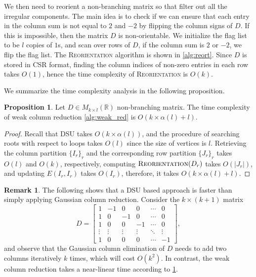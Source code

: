 \documentclass{article}
\theoremstyle{definition}
\newtheorem{remark}[theorem]{Remark}
\newtheorem{proposition}[theorem]{Proposition}
\begin{document}
We then need to reorient a non-branching matrix so that filter out all the irregular components.
The main idea is to check if we can ensure that each entry in the column sum is not equal to $2$ and $-2$ by flipping the column signs of $D$.
If this is impossible,
then the matrix $D$ is non-orientable.
We initialize the flag list to be $l$ copies of $1$s,
and scan over rows of $D$,
if the column sum is $2$ or $-2$,
we flip the flag list.
The \textsc{Reorientation} algorithm is shown in \cref{alg:reort}. 
Since $D$ is stored in CSR format,
finding the column indices of non-zero entries in each row takes $O(1)$,
hence the time complexity of \textsc{Reorientation} is $O(k)$.

We summarize the time complexity analysis in the following proposition.

\begin{proposition}
\label{prop:alg_weak_red}
Let $D\in M_{k\times l}(\mathbb{R})$ non-branching matrix.
The time complexity of weak column reduction \cref{alg:weak_red} is $O(k\times \alpha(l) + l)$.
\end{proposition}

\begin{proof}
Recall that \textsc{DSU} takes $O(k\times \alpha({l}))$,
and the procedure of searching roots with respect to loops takes $O(l)$ since the size of vertices is $l$.
Retrieving the column partition $\{I_r\}_{r}$ and the corresponding row partition $\{J_r\}_r$ takes $O(l)$ and $O(k)$, respectively,
computing $\textsc{\text{Reorientation}}(D_r)$ takes $O(|J_r|)$,
and updating $E(I_r, I_r)$ takes $O(I_r)$,
therefore,
it takes $O(k\times \alpha(l)+l)$.
\end{proof}

\begin{remark}
The following shows that a DSU based approach is faster than simply applying Gaussian column reduction. Consider the $k\times (k+1)$ matrix 
\[
D = 
\begin{bmatrix}
1 & -1 & 0  & 0 & \cdots & 0\\
1 & 0 & -1 & 0 & \cdots & 0\\
1 & 0 & 0  & -1 & \cdots & 0\\
\vdots & \vdots & \vdots & \vdots & \ddots & \vdots\\
1 & 0 & 0 & 0 & \cdots & -1
\end{bmatrix},
\]
and observe that the Gaussian column elimination of $D$ needs to add two columns iteratively $k$ times,
which will cost $O(k^2)$. In contrast,
the weak column reduction takes a near-linear time according to \cref{prop:alg_weak_red}.
\end{remark}
\end{document}
